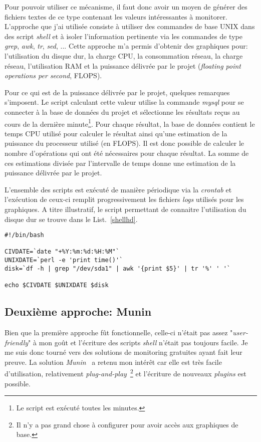 \documentclass[a4paper, 12pt]{report}
\begin{document}
Pour pouvoir utiliser ce mécanisme, il faut donc avoir un moyen de générer des fichiers textes de ce type contenant les valeurs intéressantes à monitorer. L'approche que j'ai utilisée consiste à utiliser des commandes de base UNIX dans des script \textit{shell} et à isoler l'information pertinente via les commandes de type \textit{grep}, \textit{awk}, \textit{tr}, \textit{sed}, ... Cette approche m'a permis d'obtenir des graphiques pour: l'utilisation du disque dur, la charge CPU, la consommation réseau, la charge réseau, l'utilisation RAM et la puissance délivrée par le projet (\textit{floating point operations per second}, FLOPS).

Pour ce qui est de la puissance délivrée par le projet, quelques remarques s'imposent. Le script calculant cette valeur utilise la commande \textit{mysql} pour se connecter à la base de données du projet et sélectionne les résultats reçus au cours de la dernière minute\footnote{Le script est exécuté toutes les minutes.}. Pour chaque résultat, la base de données contient le temps CPU utilisé pour calculer le résultat ainsi qu'une estimation de la puissance du processeur utilisé (en FLOPS). Il est donc possible de calculer le nombre d'opérations qui ont été nécessaires pour chaque résultat. La somme de ces estimations divisée par l'intervalle de temps donne une estimation de la puissance délivrée par le projet.

L'ensemble des scripts est exécuté de manière périodique via la \textit{crontab} et l'exécution de ceux-ci remplit progressivement les fichiers \textit{logs} utilisés pour les graphiques. A titre illustratif, le script permettant de connaitre l'utilisation du disque dur se trouve dans le List.~\ref{shellhd}. 

\begin{lstlisting}
#!/bin/bash

CIVDATE=`date "+%Y:%m:%d:%H:%M"`
UNIXDATE=`perl -e 'print time()'`
disk=`df -h | grep "/dev/sda1" | awk '{print $5}' | tr '%' ' '`

echo $CIVDATE $UNIXDATE $disk
\end{lstlisting}


\subsection{Deuxième approche: Munin}
Bien que la première approche fût fonctionnelle, celle-ci n'était pas assez "\textit{user-friendly}" à mon goût et l'écriture des scripts \textit{shell} n'était pas toujours facile. Je me suis donc tourné vers des solutions de monitoring gratuites ayant fait leur preuve. La solution \textit{Munin}~\cite{MUNIN} a retenu mon intérêt car elle est très facile d'utilisation, relativement \textit{plug-and-play}~\footnote{Il n'y a pas grand chose à configurer pour avoir accès aux graphiques de base.} et l'écriture de nouveaux \textit{plugins} est possible.
\end{document}
